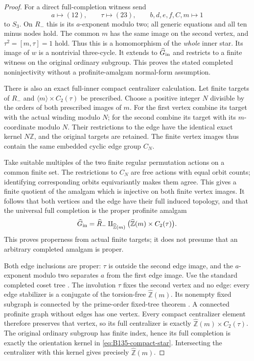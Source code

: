 \begin{proof}
For a direct full-completion witness send
\[
 a\longmapsto(12),\qquad\tau\longmapsto(23),\qquad
 b,d,e,f,C,m\longmapsto1
\]
to $S_3$. On $R_-$ this is its $a$-exponent modulo two;
all generic equations and all ten minus nodes hold. The
common $m$ has the same image on the second vertex, and
$\tau^2=[m,\tau]=1$ hold. Thus this is a homomorphism of
the \emph{whole} inner star. Its image of $w$ is a nontrivial
three-cycle. It extends to $\widehat G_{\rm in}$ and restricts
to a finite witness on the original ordinary subgroup.
This proves the stated completed noninjectivity without a
profinite-amalgam normal-form assumption.

There is also an exact full-inner compact centralizer calculation.
Let finite targets of $R_-$ and $\langle m\rangle\times C_2(\tau)$
be prescribed. Choose a positive integer $N$ divisible by the
orders of both prescribed images of $m$. For the first vertex
combine its target with the actual winding modulo $N$; for the
second combine its target with its $m$-coordinate modulo $N$.
Their restrictions to the edge have the identical exact kernel
$N\mathbb Z$, and the original targets are retained. The finite
vertex images thus contain the same embedded cyclic edge group
$C_N$.

Take suitable multiples of the two finite regular permutation
actions on a common finite set. The restrictions to $C_N$ are
free actions with equal orbit counts; identifying corresponding
orbits equivariantly makes them agree. This gives a finite
quotient of the amalgam which is injective on both finite vertex
images. It follows that both vertices and the edge have their
full induced topology, and that the universal full completion is
the proper profinite amalgam
\begin{equation}\label{eq:B135-compact-star}
 \widehat G_{\rm in}
   =\widehat R_-\amalg_{\widehat{\mathbb Z}(m)}
          \bigl(\widehat{\mathbb Z}(m)\times C_2(\tau)\bigr).
\end{equation}
This proves properness from actual finite targets; it does not
presume that an arbitrary completed amalgam is proper.

Both edge inclusions are proper: $\tau$ is outside the second
edge image, and the $a$-exponent modulo two separates $a$ from
the first edge image. Use the standard completed coset tree
\citep[Proposition~3.8]{B_ZalesskiiMelnikov1989}.
The involution $\tau$ fixes the second vertex and no edge:
every edge stabilizer is a conjugate of the torsion-free
$\widehat{\mathbb Z}(m)$. Its nonempty fixed subgraph is connected
by the prime-order fixed-tree theorem
\citep[Theorem~2.8]{B_ZalesskiiMelnikov1989}.
A connected profinite graph without edges has one vertex.
Every compact centralizer element therefore preserves that vertex,
so its full centralizer is exactly
$\widehat{\mathbb Z}(m)\times C_2(\tau)$.
The original ordinary subgroup has finite index, hence its full
completion is exactly the orientation kernel in
\eqref{eq:B135-compact-star}. Intersecting the centralizer with
this kernel gives precisely $\widehat{\mathbb Z}(m)$.


\end{proof}
